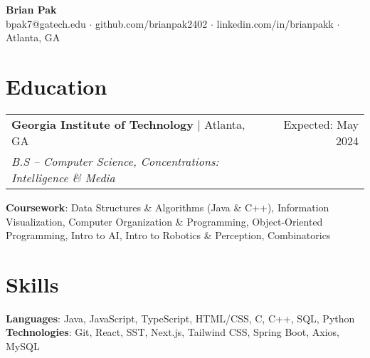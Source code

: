 \documentclass[letterpaper,11pt]{article}
\makeatletter
\newcommand{\resumeEducationHeading}[5]{
    \begin{tabular*}{0.99\textwidth}[t]{l@{\extracolsep{\fill}}r}
      \textbf{#1} $\vert$ #2 & #3 \\
      \textit{\small#4} & \textit{\small #5} \\
    \end{tabular*}\vspace{0.5pt}
}
\newcommand{\resumeExperienceHeading}[3]{
    \begin{tabular*}{0.99\textwidth}[t]{l@{\extracolsep{\fill}}r}
      \textbf{#1} $\vert$ {#2} & {#3} \\
    \end{tabular*}\vspace{-3pt}
}
\newcommand{\resumeItemListStart}{\begin{itemize}[noitemsep]\vspace{-4pt}}
\newcommand{\resumeItemListEnd}{\end{itemize}}
\makeatother
\begin{document}
\begin{center}
  \textbf{\huge Brian Pak} \\
  \vspace*{0.1cm}
  {bpak7@gatech.edu}  $\cdot$ {github.com/brianpak2402} $\cdot$ {linkedin.com/in/brianpakk}  $\cdot$ Atlanta, GA
\end{center}

\section{Education}
    \resumeEducationHeading
      {Georgia Institute of Technology}{Atlanta, GA}{Expected: May 2024}
      {B.S -- Computer Science, Concentrations: Intelligence \& Media}{\vspace{0.1cm}} 
    \textbf{Coursework}{: Data Structures \& Algorithms (Java \& C++), Information Visualization, Computer Organization \& Programming, Object-Oriented Programming, Intro to AI, Intro to Robotics \& Perception, Combinatorics} \\

  
\section{Skills}
    \textbf{Languages}{: Java, JavaScript, TypeScript, HTML/CSS, C, C++, SQL, Python} \\
    \textbf{Technologies}{: Git, React, SST, Next.js, Tailwind CSS, Spring Boot, Axios, MySQL}
\end{document}
